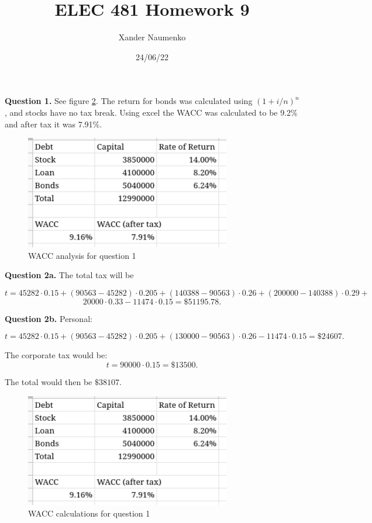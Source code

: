 \documentclass[letterpaper, reqno,11pt]{article}
\begin{document}
\title{ELEC 481 Homework 9}
\date{24/06/22}
\author{Xander Naumenko}
\maketitle

{\noindent\bf Question 1.} See figure \ref{fig:q1}. The return for bonds was calculated using $(1+i/n)^n$, and stocks have no tax break. Using excel the WACC was calculated to be 9.2\% and after tax it was 7.91\%. 

\begin{figure}[htpb]
    \centering
    \includegraphics[width=0.8\textwidth]{q1}
    \caption{WACC analysis for question 1}
    \label{fig:q1}
\end{figure}

{\noindent\bf Question 2a.} The total tax will be 

\[
t=45282\cdot 0.15+(90563-45282)\cdot 0.205+(140388-90563)\cdot 0.26+(200000-140388)\cdot 0.29+
\]
\[
20000\cdot 0.33-11474\cdot 0.15=\$51195.78
.\]

{\noindent\bf Question 2b.} Personal: 

\[
t=45282\cdot 0.15+(90563-45282)\cdot 0.205+(130000-90563)\cdot 0.26-11474\cdot 0.15=\$24607
.\]

The corporate tax would be: 
\[
t=90000\cdot 0.15=\$13500
.\]

The total would then be $\$38107$. 

\begin{figure}[htpb]
    \centering
    \includegraphics[width=0.8\textwidth]{q1}
    \caption{WACC calculations for question 1}
    \label{fig:q1}
\end{figure}
\end{document}
